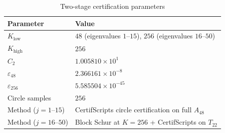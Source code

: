 \documentclass[11pt]{article}
\begin{document}
\begin{table}[ht]
\centering
\caption{Two-stage certification parameters}
\label{tab:two-stage-params}
\begin{tabular}{ll}
\toprule
Parameter & Value \\
\midrule
$K_{\mathrm{low}}$ & $48$ (eigenvalues $1$--$15$), $256$ (eigenvalues $16$--$50$) \\
$K_{\mathrm{high}}$ & $256$ \\
$C_2$ & $1.005810 \times 10^{1}$ \\
$\varepsilon_{48}$ & $2.366161 \times 10^{-8}$ \\
$\varepsilon_{256}$ & $5.585504 \times 10^{-45}$ \\
Circle samples & $256$ \\
Method ($j = 1$--$15$) & CertifScripts circle certification on full $A_{48}$ \\
Method ($j = 16$--$50$) & Block Schur at $K = 256$ + CertifScripts on $T_{22}$ \\
\bottomrule
\end{tabular}
\end{table}
\end{document}
